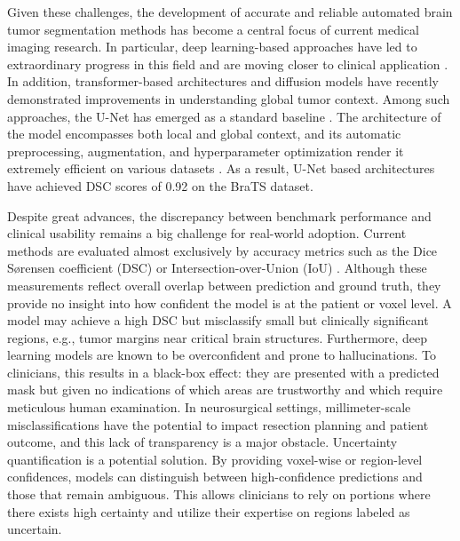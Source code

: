 \documentclass[11pt,letterpaper]{article}
\begin{document}
Given these challenges, the development of accurate and reliable automated brain tumor segmentation methods has become a central focus of current medical imaging research. In particular, deep learning-based approaches have led to extraordinary progress in this field and are moving closer to clinical application \cite{fischl2012,shattuck2002}. In addition, transformer-based architectures and diffusion models have recently demonstrated improvements in understanding global tumor context. Among such approaches, the U-Net has emerged as a standard baseline \cite{ronneberger2015}. The architecture of the model encompasses both local and global context, and its automatic preprocessing, augmentation, and hyperparameter optimization render it extremely efficient on various datasets \cite{nnUnet}. As a result, U-Net based architectures have achieved DSC scores of 0.92 on the BraTS dataset.

Despite great advances, the discrepancy between benchmark performance and clinical usability remains a big challenge for real-world adoption. Current methods are evaluated almost exclusively by accuracy metrics such as the Dice Sørensen coefficient (DSC) or Intersection-over-Union (IoU) \cite{zhou2024metastasis}. Although these measurements reflect overall overlap between prediction and ground truth, they provide no insight into how confident the model is at the patient or voxel level. A model may achieve a high DSC but misclassify small but clinically significant regions, e.g., tumor margins near critical brain structures. Furthermore, deep learning models are known to be overconfident and prone to hallucinations. To clinicians, this results in a black-box effect: they are presented with a predicted mask but given no indications of which areas are trustworthy and which require meticulous human examination. In neurosurgical settings, millimeter-scale misclassifications have the potential to impact resection planning and patient outcome, and this lack of transparency is a major obstacle. Uncertainty quantification is a potential solution. By providing voxel-wise or region-level confidences, models can distinguish between high-confidence predictions and those that remain ambiguous. This allows clinicians to rely on portions where there exists high certainty and utilize their expertise on regions labeled as uncertain.
\end{document}
